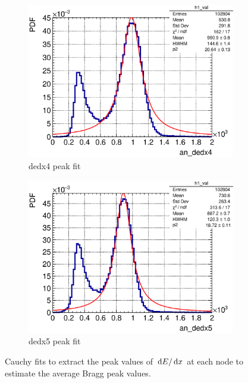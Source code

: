 \begin{figure}[t]
\begin{subfigure}{\dbfigwid\textwidth}
         \includegraphics[width=\textwidth]{figures/sel/ans_dedx4_pdf_al2_selpr_con_test.eps}
         \caption{dedx4 peak fit}
         \label{subfig:dedx4-peak}
    \end{subfigure}
    \begin{subfigure}{\dbfigwid\textwidth}
         \includegraphics[width=\textwidth]{figures/sel/ans_dedx5_pdf_al2_selpr_con_test.eps}
         \caption{dedx5 peak fit}
         \label{subfig:dedx5-peak}
    \end{subfigure}
    \caption{Cauchy fits to extract the peak values of $\,\textrm{d}E/\,\textrm{d}x$ at each node to estimate the average Bragg peak values.}
    \label{fig:esc-andedx-peaks}
  \end{figure}

